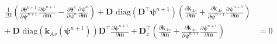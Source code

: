 \begin{align}
\label{eq:richards-timestep-deriv}
\frac{1}{\Delta t}
\left(
    \frac{\partial \boldsymbol{\theta}^{n+1}}{\partial\boldsymbol{\psi}^{n+1}}
    \frac{\partial \boldsymbol{\psi}^{n+1}}{\partial\mathbf{m}}
    -
    \frac{\partial \boldsymbol{\theta}^n}{\partial\boldsymbol{\psi}^n}
    \frac{\partial \boldsymbol{\psi}^n}{\partial\mathbf{m}}
\right)
+
\mathbf{D}
    \text{ diag}\left( \mathbf{D}^{\top} \boldsymbol{\psi}^{n+1} \right)
    \left(
        \frac{\partial \mathbf{k}_{Av}}{\partial\mathbf{m}} +
        \frac{\partial \mathbf{k}_{Av}}{\partial\boldsymbol{\psi}^{n+1}}
        \frac{\partial \boldsymbol{\psi}^{n+1}}{\partial\mathbf{m}}
    \right)
\nonumber\\
+\
\mathbf{D}
    \text{ diag}\left( \mathbf{k}_{Av}(\boldsymbol{\psi}^{n+1}) \right)
\mathbf{D}^{\top}
\frac{\partial \boldsymbol{\psi}^{n+1}}{\partial\mathbf{m}}
+
\mathbf{D}_{z}^{\top}
\left(
    \frac{\partial \mathbf{k}_{Av}}{\partial\mathbf{m}} +
    \frac{\partial \mathbf{k}_{Av}}{\partial\boldsymbol{\psi}^{n+1}}
    \frac{\partial \boldsymbol{\psi}^{n+1}}{\partial\mathbf{m}}
\right)
& = 0
\end{align}
